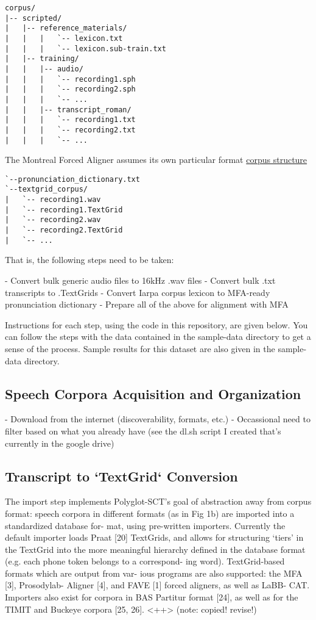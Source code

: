\documentclass[11pt]{article}
\begin{document}
\begin{verbatim}
corpus/
|-- scripted/
|   |-- reference_materials/
|   |   |   `-- lexicon.txt
|   |   |   `-- lexicon.sub-train.txt
|   |-- training/
|   |   |-- audio/
|   |   |   `-- recording1.sph
|   |   |   `-- recording2.sph
|   |   |   `-- ...
|   |   |-- transcript_roman/
|   |   |   `-- recording1.txt
|   |   |   `-- recording2.txt
|   |   |   `-- ...
\end{verbatim}

The Montreal Forced Aligner assumes its own particular format \href{https://montreal-forced-aligner.readthedocs.io/en/latest/user_guide/formats/corpus_structure.html}{corpus structure}

\begin{verbatim}
`--pronunciation_dictionary.txt
`--textgrid_corpus/
|   `-- recording1.wav
|   `-- recording1.TextGrid
|   `-- recording2.wav
|   `-- recording2.TextGrid
|   `-- ...
\end{verbatim}

That is, the following steps need to be taken:

- Convert bulk generic audio files to 16kHz .wav files
- Convert bulk .txt transcripts to .TextGrids
- Convert Iarpa corpus lexicon to MFA-ready pronunciation dictionary
- Prepare all of the above for alignment with MFA

Instructions for each step, using the code in this repository, are given below. You can follow the steps with the data contained in the sample-data directory to get a sense of the process. Sample results for this dataset are also given in the sample-data directory.


\subsection{Speech Corpora Acquisition and Organization}

- Download from the internet (discoverability, formats, etc.)
- Occassional need to filter based on what you already have (see the dl.sh script I created that's currently in the google drive)

\subsection{Transcript to `TextGrid` Conversion}

The import step implements Polyglot-SCT’s goal of abstraction
away from corpus format: speech corpora in different formats
(as in Fig 1b) are imported into a standardized database for-
mat, using pre-written importers. Currently the default importer
loads Praat [20] TextGrids, and allows for structuring ‘tiers’ in
the TextGrid into the more meaningful hierarchy defined in the
database format (e.g. each phone token belongs to a correspond-
ing word). TextGrid-based formats which are output from var-
ious programs are also supported: the MFA [3], Prosodylab-
Aligner [4], and FAVE [1] forced aligners, as well as LaBB-
CAT. Importers also exist for corpora in BAS Partitur format
[24], as well as for the TIMIT and Buckeye corpora [25, 26].
<++> (note: copied! revise!)
\end{document}
